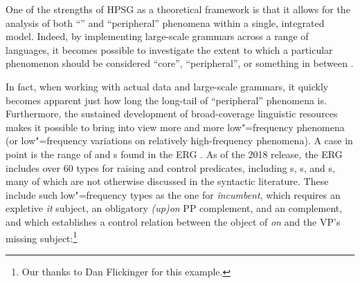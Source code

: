 \documentclass[output=paper
	        ,collection
	        ,collectionchapter
 	        ,biblatex
                ,babelshorthands
                ,newtxmath
                ,draftmode
                ,colorlinks, citecolor=brown
]{langscibook}
\begin{document}
One of the strengths of HPSG as a theoretical framework is that it allows for
the analysis of both ``'' and ``peripheral'' phenomena within a single, integrated model.
Indeed, by implementing large-scale grammars across a range of languages,
it becomes possible to investigate the extent to which
a particular phenomenon should be considered ``core'', ``peripheral'',
or something in between \citep{MuellerKernigkeit}.

\begin{sloppypar}
In fact, when working with actual data and large-scale grammars,
it quickly becomes apparent just how long the long-tail of ``peripheral'' phenomena is. Furthermore,
the sustained development of broad-coverage linguistic resources makes it possible to bring into
view more and more low"=frequency phenomena (or low"=frequency variations on relatively
high-frequency phenomena). A case in point is the range of  and 
s found in the ERG
\citep{Flickinger2000a,Flickinger2011a-u}. As of the 2018 release, the ERG includes over 60 types
for raising and control predicates, including s, s, and s,
many of which are not otherwise discussed in the syntactic literature. These include such
low"=frequency types as the one for \textit{incumbent}, which requires an expletive \textit{it}
subject, an obligatory \textit{(up)on} PP complement, and an  complement,
and which establishes a control relation between the object of \textit{on} and the VP's missing subject:\footnote{%
	Our thanks to Dan Flickinger for this example.
}
\end{sloppypar}
\end{document}
